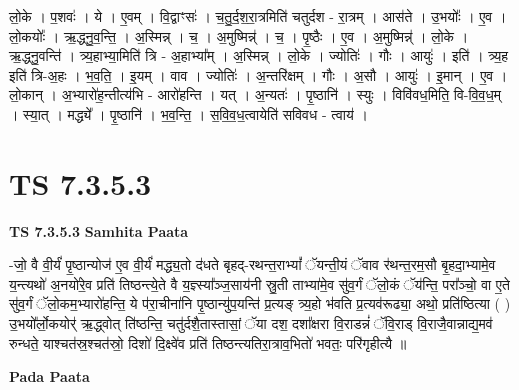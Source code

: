 \documentclass[17pt]{extarticle}
\begin{document}
लो॒के । प॒शवः॑ । ये । ए॒वम् । वि॒द्वाꣳसः॑ । च॒तु॒र्द॒श॒रा॒त्रमिति॑ चतुर्दश - रा॒त्रम् । आस॑ते । उ॒भयोः᳚ । ए॒व । लो॒कयोः᳚ । ऋ॒द्ध्नु॒व॒न्ति॒ । अ॒स्मिन्न् । च॒ । अ॒मुष्मिन्न्॑ । च॒ । पृ॒ष्ठैः । ए॒व । अ॒मुष्मिन्न्॑ । लो॒के । ऋ॒द्ध्नु॒वन्ति॑ । त्र्य॒हाभ्या॒मिति॑ त्रि - अ॒हाभ्या᳚म् । अ॒स्मिन्न् । लो॒के । ज्योतिः॑ । गौः । आयुः॑ । इति॑ । त्र्य॒ह इति॑ त्रि-अ॒हः । भ॒व॒ति॒ । इ॒यम् । वाव । ज्योतिः॑ । अ॒न्तरि॑क्षम् । गौः । अ॒सौ । आयुः॑ । इ॒मान् । ए॒व । लो॒कान् । अ॒भ्यारो॑ह॒न्तीत्य॑भि - आरो॑हन्ति । यत् । अ॒न्यतः॑ । पृ॒ष्ठानि॑ । स्युः । विवि॑वध॒मिति॒ वि-वि॒व॒ध॒म् । स्या॒त् । मद्ध्ये᳚ । पृ॒ष्ठानि॑ । भ॒व॒न्ति॒ । स॒वि॒व॒ध॒त्वायेति॑ सविवध - त्वाय॑ ।  \newline




\section*{ TS 7.3.5.3 }

\textbf{TS 7.3.5.3 } \newline
\textbf{Samhita Paata} \newline

-जो॒ वै वी॒र्यं॑ पृ॒ष्ठान्योज॑ ए॒व वी॒र्यं॑ मद्ध्य॒तो द॑धते बृहद्-रथन्त॒राभ्यां᳚ ॅयन्ती॒यं ॅवाव र॑थन्त॒रम॒सौ बृ॒हदा॒भ्यामे॒व य॒न्त्यथो॑ अ॒नयो॑रे॒व प्रति॑ तिष्ठन्त्ये॒ते वै य॒ज्ञ्स्या᳚ञ्ज॒साय॑नी स्रु॒ती ताभ्या॑मे॒व सु॑व॒र्गं ॅलो॒कं ॅय॑न्ति॒ परा᳚ञ्चो॒ वा ए॒ते सु॑व॒र्गं ॅलो॒कम॒भ्यारो॑हन्ति॒ ये प॑रा॒चीना॑नि पृ॒ष्ठान्यु॑प॒यन्ति॑ प्र॒त्यङ् त्र्य॒हो भ॑वति प्र॒त्यव॑रूढ्या॒ अथो॒ प्रति॑ष्ठित्या ( ) उ॒भयो᳚र्लो॒कयोर्॑ ऋ॒द्ध्वोत् ति॑ष्ठन्ति॒ चतु॑र्दशै॒तास्तासां॒ ॅया दश॒ दशा᳚क्षरा वि॒राडन्नं॑ ॅवि॒राड् वि॒राजै॒वान्नाद्य॒मव॑ रुन्धते॒ याश्चत॑स्र॒श्चत॑स्रो॒ दिशो॑ दि॒क्ष्वे॑व प्रति॑ तिष्ठन्त्यतिरा॒त्राव॒भितो॑ भवतः॒ परि॑गृहीत्यै ॥ \newline

\textbf{Pada Paata} \newline
\end{document}
